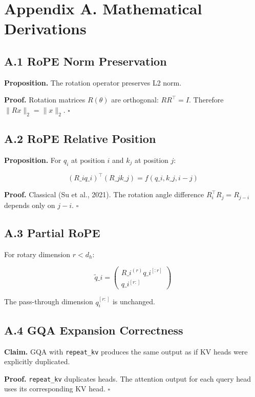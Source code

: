 
\section{Appendix A. Mathematical Derivations}

\subsection{A.1 RoPE Norm Preservation}

\textbf{Proposition.} The rotation operator preserves L2 norm.

\textbf{Proof.} Rotation matrices $R(\theta)$ are orthogonal: $R R^\top = I$. 
Therefore $\|R x\|_2 = \|x\|_2$. $\square$

\subsection{A.2 RoPE Relative Position}

\textbf{Proposition.} For $q_i$ at position $i$ and $k_j$ at position $j$:

\[
(R\_i q\_i)^\top (R\_j k\_j) = f(q\_i, k\_j, i - j)
\tag{A.1}
\]

\textbf{Proof.} Classical (Su et al., 2021). The rotation angle difference 
$R_i^\top R_j = R_{j-i}$ depends only on $j - i$. $\square$

\subsection{A.3 Partial RoPE}

For rotary dimension $r < d_h$:

\[
\tilde{q}\_i = \begin{pmatrix} R\_i^{(r)} q\_i^{[:r]} \\ q\_i^{[r:]} \end{pmatrix}
\tag{A.2}
\]

The pass-through dimension $q_i^{[r:]}$ is unchanged.

\subsection{A.4 GQA Expansion Correctness}

\textbf{Claim.} GQA with \texttt{repeat\_kv} produces the same output as if KV heads 
were explicitly duplicated.

\textbf{Proof.} \texttt{repeat\_kv} duplicates heads. The attention output for each 
query head uses its corresponding KV head. $\square$

